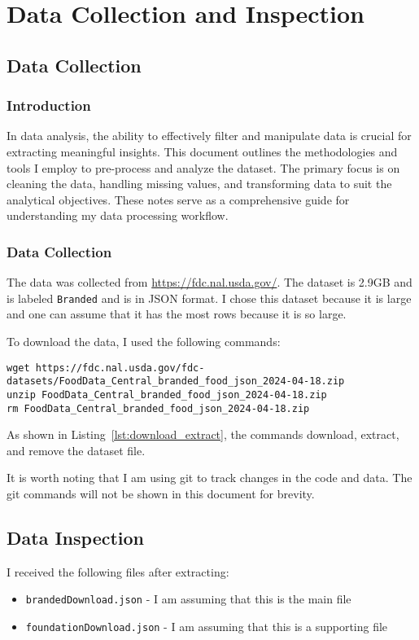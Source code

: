 \chapter{Data Collection and Inspection}
\section{Data Collection} 
\subsection{Introduction}

In data analysis, the ability to effectively filter and manipulate data is crucial for extracting meaningful insights. This document outlines the methodologies and tools I employ to pre-process and analyze the dataset. The primary focus is on cleaning the data, handling missing values, and transforming data to suit the analytical objectives. These notes serve as a comprehensive guide for understanding my data processing workflow.

\subsection{Data Collection}

The data was collected from \url{https://fdc.nal.usda.gov/}. The dataset is 2.9GB and is labeled \texttt{Branded} and is in JSON format. I chose this dataset because it is large and one can assume that it has the most rows because it is so large. 

To download the data, I used the following commands: 

\begin{lstlisting}[style=bashStyle, caption={Download, Extract, and Remove Zip File}, label={lst:download_extract}]
wget https://fdc.nal.usda.gov/fdc-datasets/FoodData_Central_branded_food_json_2024-04-18.zip
unzip FoodData_Central_branded_food_json_2024-04-18.zip 
rm FoodData_Central_branded_food_json_2024-04-18.zip
\end{lstlisting}

As shown in Listing~\ref{lst:download_extract}, the commands download, extract, and remove the dataset file.

It is worth noting that I am using git to track changes in the code and data. The git commands will not be shown in this document for brevity.

\section{Data Inspection}
I received the following files after extracting:
  \begin{itemize}
    \item \texttt{brandedDownload.json} - I am assuming that this is the main file
    \item \texttt{foundationDownload.json} - I am assuming that this is a supporting file
  \end{itemize}

